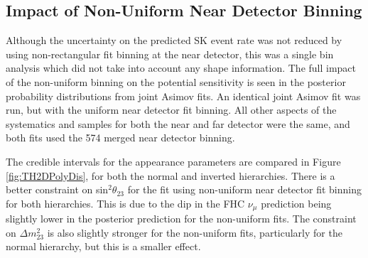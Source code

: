 \subsection{Impact of Non-Uniform Near Detector Binning}\label{sec:jointpoly}

Although the uncertainty on the predicted SK event rate was not reduced by using non-rectangular fit binning at the near detector, this was a single bin analysis which did not take into account any shape information. The full impact of the non-uniform binning on the potential sensitivity is seen in the posterior probability distributions from joint Asimov fits. An identical joint Asimov fit was run, but with the uniform near detector fit binning. All other aspects of the systematics and samples for both the near and far detector were the same, and both fits used the 574 merged near detector binning.

The credible intervals for the appearance parameters are compared in Figure \ref{fig:TH2DPolyDis}, for both the normal and inverted hierarchies. There is a better constraint on sin$^{2}\theta_{23}$ for the fit using non-uniform near detector fit binning for both hierarchies. This is due to the dip in the FHC $\nu_{\mu}$ prediction being slightly lower in the posterior prediction for the non-uniform fits. The constraint on $\Delta m_{23}^{2}$ is also slightly stronger for the non-uniform fits, particularly for the normal hierarchy, but this is a smaller effect.

